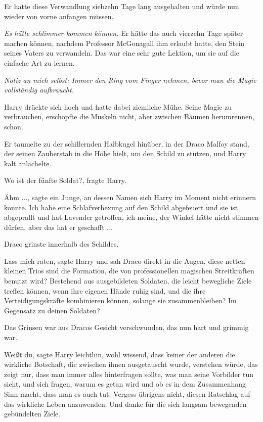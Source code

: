 Er hatte diese Verwandlung siebzehn Tage lang ausgehalten und würde nun wieder
von vorne anfangen müssen.

\emph{Es hätte schlimmer kommen können.} Er hätte das auch vierzehn Tage später
machen können, nachdem Professor McGonagall ihm erlaubt hatte, den Stein seines
Vaters zu verwandeln. Das war eine sehr gute Lektion, um sie auf die einfache
Art zu lernen.

\emph{Notiz an mich selbst: Immer den Ring vom Finger nehmen, bevor man die
Magie vollständig aufbraucht.}

Harry drückte sich hoch und hatte dabei ziemliche Mühe. Seine Magie zu
verbrauchen, erschöpfte die Muskeln nicht, aber zwischen Bäumen herumrennen,
schon.

Er taumelte zu der schillernden Halbkugel hinüber, in der Draco Malfoy stand,
der seinen Zauberstab in die Höhe hielt, um den Schild zu stützen, und Harry
kalt anlächelte.

\glqq{}Wo ist der fünfte Soldat?\grqq{}, fragte Harry.

\glqq{}Ähm ...\grqq{}, sagte ein Junge, an dessen Namen sich Harry im Moment
nicht erinnern konnte. \glqq{}Ich habe eine Schlafverhexung auf den Schild
abgefeuert und sie ist abgeprallt und hat Lavender getroffen, ich meine, der
Winkel hätte nicht stimmen dürfen, aber das hat er geschafft ...\grqq{}

Draco grinste innerhalb des Schildes.

\glqq{}Lass mich raten\grqq{}, sagte Harry und sah Draco direkt in die Augen,
\glqq{}diese netten kleinen Trios sind die Formation, die von professionellen
magischen Streitkräften benutzt wird? Bestehend aus ausgebildeten Soldaten, die
leicht bewegliche Ziele treffen können, wenn ihre eigenen Hände ruhig sind, und
die ihre Verteidigungskräfte kombinieren können, solange sie zusammenbleiben? Im
Gegensatz zu deinen Soldaten?\grqq{}

Das Grinsen war aus Dracos Gesicht verschwunden, das nun hart und grimmig war.

\glqq{}Weißt du\grqq{}, sagte Harry leichthin, wohl wissend, dass keiner der
anderen die wirkliche Botschaft, die zwischen ihnen ausgetauscht wurde,
verstehen würde, \glqq{}das zeigt nur, dass man immer alles hinterfragen sollte,
was man seine Vorbilder tun sieht, und sich fragen, warum es getan wird und ob
es in dem Zusammenhang Sinn macht, dass man es auch tut. Vergess übrigens nicht,
diesen Ratschlag auf das wirkliche Leben anzuwenden. Und danke für die sich
langsam bewegenden gebündelten Ziele.\grqq{}

